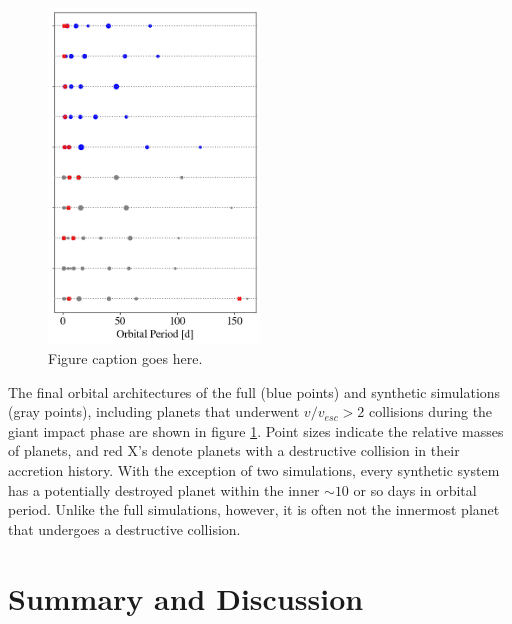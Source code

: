 \begin{figure}
\begin{center}
    \includegraphics[width=0.5\textwidth]{figures/stip/architectures_syn_comp.png}
    \caption{Figure caption goes here.\label{fig:architectures_syn_comp}}
\end{center}
\end{figure}

The final orbital architectures of the full (blue points) and synthetic simulations (gray points), including planets that underwent $v/v_{esc} > 2$ collisions during the giant impact phase are shown in figure \ref{fig:architectures_syn_comp}. Point sizes indicate the relative masses of planets, and red X's denote planets with a destructive collision in their accretion history. With the exception of two simulations, every synthetic system has a potentially destroyed planet within the inner $\sim 10$ or so days in orbital period. Unlike the full simulations, however, it is often not the innermost planet that undergoes a destructive collision.

\section{Summary and Discussion} \label{sec:discuss}